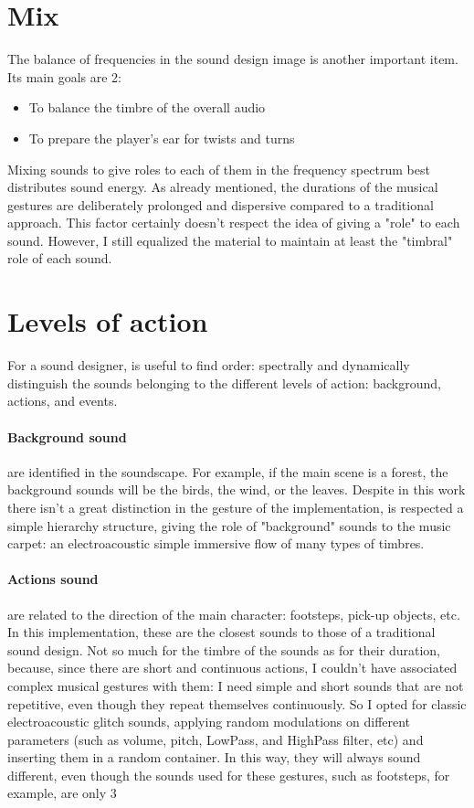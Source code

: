 \section{Mix}
The balance of frequencies in the sound design image is another important item. Its main goals are 2:

\begin{itemize}
	\item To balance the timbre of the overall audio
	\item To prepare the player's ear for twists and turns
\end{itemize}

Mixing sounds to give roles to each of them in the frequency spectrum best distributes sound energy.
As already mentioned, the durations of the musical gestures are deliberately prolonged and dispersive compared to a traditional approach. This factor certainly doesn't respect the idea of ​​giving a "role" to each sound. However, I still equalized the material to maintain at least the "timbral" role of each sound.

\section{Levels of action}
For a sound designer, is useful to find order: spectrally and dynamically distinguish the sounds belonging to the different levels of action: background, actions, and events.

\paragraph{Background sound} are identified in the soundscape. For example, if the main scene is a forest, the background sounds will be the birds, the wind, or the leaves. Despite in this work there isn't a great distinction in the gesture of the implementation, is respected a simple hierarchy structure, giving the role of "background" sounds to the music carpet: an electroacoustic simple immersive flow of many types of timbres.

\paragraph{Actions sound} are related to the direction of the main character: footsteps, pick-up objects, etc. In this implementation, these are the closest sounds to those of a traditional sound design. Not so much for the timbre of the sounds as for their duration, because, since there are short and continuous actions, I couldn't have associated complex musical gestures with them: I need simple and short sounds that are not repetitive, even though they repeat themselves continuously. So I opted for classic electroacoustic glitch sounds, applying random modulations on different parameters (such as volume, pitch, LowPass, and HighPass filter, etc) and inserting them in a random container. In this way, they will always sound different, even though the sounds used for these gestures, such as footsteps, for example, are only 3
